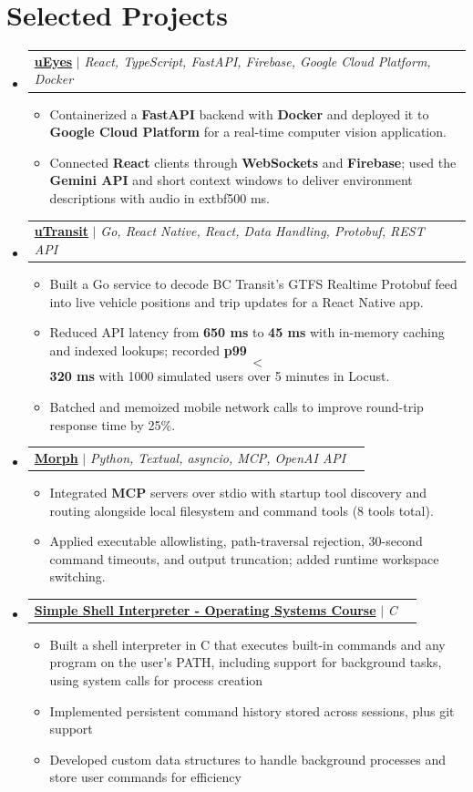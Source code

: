 \documentclass[letterpaper,10pt]{article}
\makeatletter
\newcommand{\resumeItem}[1]{
  \item\small{
    {#1 \vspace{-1pt}}
  }
}
\newcommand{\resumeProjectHeading}[2]{
    \item
    \begin{tabularx}{0.97\textwidth}{@{}Xr@{}}
      \small#1 & #2 \\
    \end{tabularx}\vspace{-6pt}
}
\newcommand{\resumeSubHeadingListStart}{\begin{itemize}[leftmargin=0.15in, label={}]}
\newcommand{\resumeSubHeadingListEnd}{\end{itemize}}
\newcommand{\resumeItemListStart}{\begin{itemize}[label=$\bullet$, itemsep=1.20pt, topsep=0pt, parsep=0pt]}
\newcommand{\resumeItemListEnd}{\end{itemize}\vspace{-2pt}}
\makeatother
\begin{document}
\section{Selected Projects}
\resumeSubHeadingListStart
\resumeProjectHeading{\href{https://github.com/samnne/u-eyes}{\textbf{uEyes}} $|$ \emph{React, TypeScript, FastAPI, Firebase, Google Cloud Platform, Docker}}{}
\resumeItemListStart
  \resumeItem{Containerized a \textbf{FastAPI} backend with \textbf{Docker} and deployed it to \textbf{Google Cloud Platform} for a real-time computer vision application.}
  \resumeItem{Connected \textbf{React} clients through \textbf{WebSockets} and \textbf{Firebase}; used the \textbf{Gemini API} and short context windows to deliver environment descriptions with audio in 	extbf{500 ms}.}
\resumeItemListEnd
\resumeProjectHeading{\href{https://github.com/samnne/utransit}{\textbf{uTransit}} $|$ \emph{Go, React Native, React, Data Handling, Protobuf, REST API}}{}
\resumeItemListStart
  \resumeItem{Built a Go service to decode BC Transit's GTFS Realtime Protobuf feed into live vehicle positions and trip updates for a React Native app.}
  \resumeItem{Reduced API latency from \textbf{650 ms} to \textbf{45 ms} with in-memory caching and indexed lookups; recorded \textbf{p99} $$<$$ \textbf{320 ms} with 1000 simulated users over 5 minutes in Locust.}
  \resumeItem{Batched and memoized mobile network calls to improve round-trip response time by 25\%.}
\resumeItemListEnd
\resumeProjectHeading{\href{https://github.com/samnne/morph-ai}{\textbf{Morph}} $|$ \emph{Python, Textual, asyncio, MCP, OpenAI API}}{}
\resumeItemListStart
  \resumeItem{Integrated \textbf{MCP} servers over stdio with startup tool discovery and routing alongside local filesystem and command tools (8 tools total).}
  \resumeItem{Applied executable allowlisting, path-traversal rejection, 30-second command timeouts, and output truncation; added runtime workspace switching.}
\resumeItemListEnd
\resumeProjectHeading{\href{https://github.com/samnne/ssi}{\textbf{Simple Shell Interpreter - Operating Systems Course}} $|$ \emph{C}}{}
\resumeItemListStart
  \resumeItem{Built a shell interpreter in C that executes built-in commands and any program on the user's PATH, including support for background tasks, using system calls for process creation}
  \resumeItem{Implemented persistent command history stored across sessions, plus git support}
  \resumeItem{Developed custom data structures to handle background processes and store user commands for efficiency}
\resumeItemListEnd
\resumeSubHeadingListEnd
\end{document}
